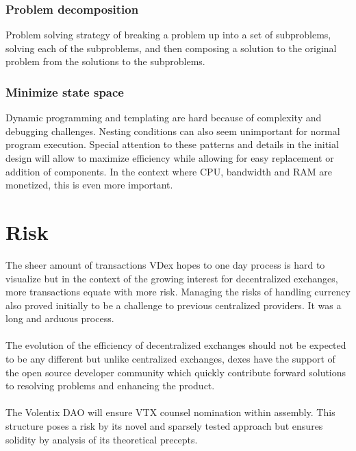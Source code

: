 \documentclass[]{article}
\begin{document}
	\subsubsection{Problem decomposition}
	Problem solving strategy of breaking a problem up into a set of subproblems, solving each of the subproblems, and then composing a solution to the original problem from the solutions to the subproblems.
	\subsubsection{Minimize state space}
	Dynamic programming and templating are hard because of complexity and debugging challenges. 
	Nesting conditions can also seem unimportant for normal program execution.
	Special attention to these patterns and details in the initial design will allow to maximize efficiency while allowing for easy replacement or addition of components.   
	In the context where CPU, bandwidth and RAM are monetized, this is even more important. 
	
\section{Risk}
	The sheer amount of transactions VDex hopes to one day process is hard to visualize but in the context of the growing interest for decentralized exchanges, more transactions equate with more risk. 
	Managing the risks of handling currency also proved initially to be a challenge to previous centralized providers. It was a long and arduous process.\\
	\paragraph{} The evolution of the efficiency of decentralized exchanges should not be expected to be any different but unlike centralized exchanges, dexes have the support of the open source developer community which quickly contribute forward solutions to resolving problems and enhancing the product. \\
	\paragraph{}  The Volentix DAO will ensure VTX counsel nomination within assembly. This structure poses a risk by its novel and sparsely tested approach but ensures solidity by analysis of its theoretical precepts.
\paragraph{}
\end{document}
